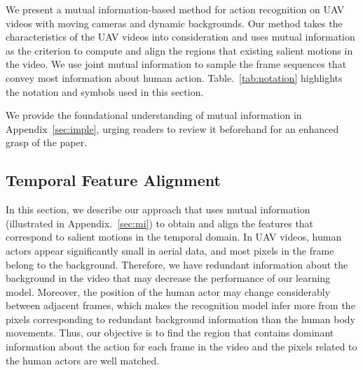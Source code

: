 \documentclass[10pt,twocolumn,letterpaper]{article}
\begin{document}
We present a mutual information-based method for action recognition on UAV videos with moving cameras and dynamic backgrounds. Our method takes the characteristics of the UAV videos into consideration and uses mutual information as the criterion to compute and align the regions that existing salient motions in the video.
We use joint mutual information to sample the frame sequences that convey most information about human action. Table.~\ref{tab:notation} highlights the notation and symbols used in this section. {We provide the foundational understanding of mutual information in Appendix~\ref{sec:imple}, urging readers to review it beforehand for an enhanced grasp of the paper.
\begin{table}
\centering
{}
\caption{Notation and symbols used in the paper.}
\vspace{-9pt}
\label{tab:notation}
\end{table} 

\subsection{Temporal Feature Alignment}\label{sec:tfa}

In this section, we describe our approach that uses mutual information (illustrated in Appendix.~\ref{sec:mi}) to obtain and align the features that correspond to salient motions in the temporal domain. In UAV videos, human actors appear significantly small in aerial data, and most pixels in the frame belong to the background. Therefore, we have redundant information about the background in the video that may decrease the performance of our learning model. Moreover, the position of the human actor may change considerably between adjacent frames, which makes the recognition model infer more from the pixels corresponding to redundant background information than the human body movements.
Thus, our objective is to find the region that contains dominant information about the action for each frame in the video and the pixels related to the human actors are well matched.

}
\end{document}
